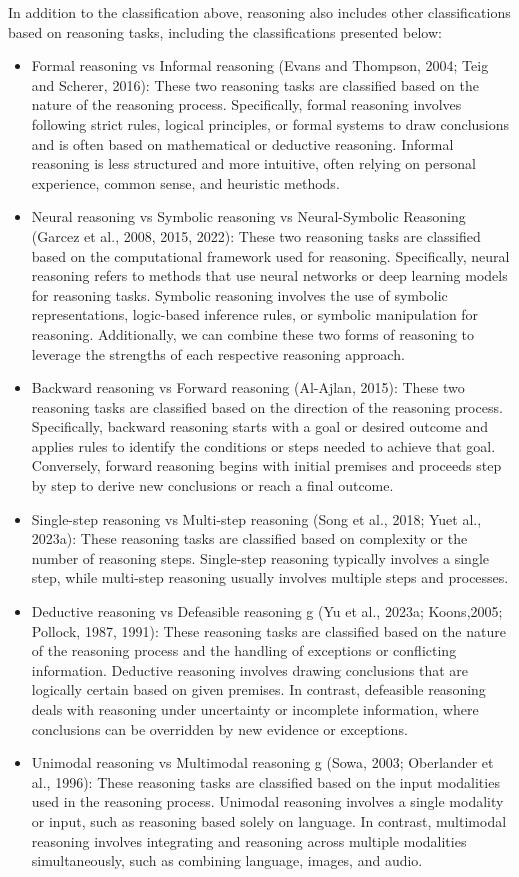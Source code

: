 In addition to the classification above, reasoning also includes other classifications based on reasoning tasks, including the classifications presented below:
\begin{itemize}
    \item Formal reasoning vs Informal reasoning (Evans and Thompson, 2004; Teig and Scherer, 2016): These two reasoning tasks are classified based on the nature of the reasoning process. Specifically, formal reasoning involves following strict rules, logical principles, or formal systems to draw conclusions and is often based on mathematical or deductive reasoning. Informal reasoning is less structured and more intuitive, often relying on personal experience, common sense, and heuristic methods.
    \item Neural reasoning vs Symbolic reasoning vs  Neural-Symbolic Reasoning (Garcez et al., 2008, 2015, 2022): These two reasoning tasks are classified based on the computational framework used for reasoning. Specifically, neural reasoning refers to methods that use neural networks or deep learning models for reasoning tasks. Symbolic reasoning involves the use of symbolic representations, logic-based inference rules, or symbolic manipulation for reasoning. Additionally, we can combine these two forms of reasoning to leverage the strengths of each respective reasoning approach.
    \item Backward reasoning vs Forward reasoning (Al-Ajlan, 2015): These two reasoning tasks are classified based on the direction of the reasoning process. Specifically, backward reasoning starts with a goal or desired outcome and applies rules to identify the conditions or steps needed to achieve that goal. Conversely, forward reasoning begins with initial premises and proceeds step by step to derive new conclusions or reach a final outcome.
    \item Single-step reasoning vs Multi-step reasoning (Song et al., 2018; Yuet al., 2023a): These reasoning tasks are classified based on complexity or the number of reasoning steps. Single-step reasoning typically involves a single step, while multi-step reasoning usually involves multiple steps and processes.
    \item Deductive reasoning vs Defeasible reasoning g (Yu et al., 2023a; Koons,2005; Pollock, 1987, 1991): These reasoning tasks are classified based on the nature of the reasoning process and the handling of exceptions or conflicting information. Deductive reasoning involves drawing conclusions that are logically certain based on given premises. In contrast, defeasible reasoning deals with reasoning under uncertainty or incomplete information, where conclusions can be overridden by new evidence or exceptions.
    \item Unimodal reasoning vs Multimodal reasoning g (Sowa, 2003; Oberlander et al., 1996): These reasoning tasks are classified based on the input modalities used in the reasoning process. Unimodal reasoning involves a single modality or input, such as reasoning based solely on language. In contrast, multimodal reasoning involves integrating and reasoning across multiple modalities simultaneously, such as combining language, images, and audio.
\end{itemize}

